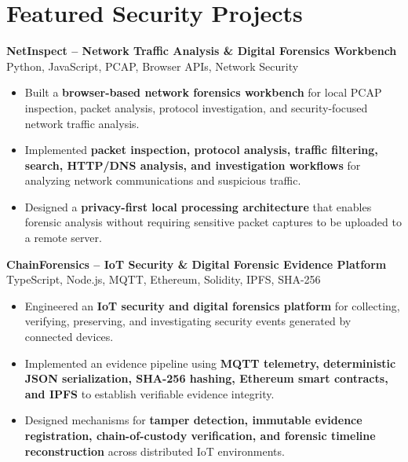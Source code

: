 \documentclass[a4paper,11pt]{article}
\newcommand{\resumeItem}[1]{
    \item \small{#1 \vspace{-2pt}}
}
\newcommand{\resumeProject}[2]{
    \vspace{2pt}
    \textbf{#1} \hfill {\small #2}
    \vspace{2pt}
}
\begin{document}
\vspace{-10pt}


\section{Featured Security Projects}

\resumeProject
{NetInspect -- Network Traffic Analysis \& Digital Forensics Workbench}
{Python, JavaScript, PCAP, Browser APIs, Network Security}

\begin{itemize}[leftmargin=*]

\resumeItem{Built a \textbf{browser-based network forensics workbench} for local PCAP inspection, packet analysis, protocol investigation, and security-focused network traffic analysis.}

\resumeItem{Implemented \textbf{packet inspection, protocol analysis, traffic filtering, search, HTTP/DNS analysis, and investigation workflows} for analyzing network communications and suspicious traffic.}

\resumeItem{Designed a \textbf{privacy-first local processing architecture} that enables forensic analysis without requiring sensitive packet captures to be uploaded to a remote server.}

\end{itemize}

\vspace{1mm}

\resumeProject
{ChainForensics -- IoT Security \& Digital Forensic Evidence Platform}
{TypeScript, Node.js, MQTT, Ethereum, Solidity, IPFS, SHA-256}

\begin{itemize}[leftmargin=*]

\resumeItem{Engineered an \textbf{IoT security and digital forensics platform} for collecting, verifying, preserving, and investigating security events generated by connected devices.}

\resumeItem{Implemented an evidence pipeline using \textbf{MQTT telemetry, deterministic JSON serialization, SHA-256 hashing, Ethereum smart contracts, and IPFS} to establish verifiable evidence integrity.}

\resumeItem{Designed mechanisms for \textbf{tamper detection, immutable evidence registration, chain-of-custody verification, and forensic timeline reconstruction} across distributed IoT environments.}

\end{itemize}
\end{document}
